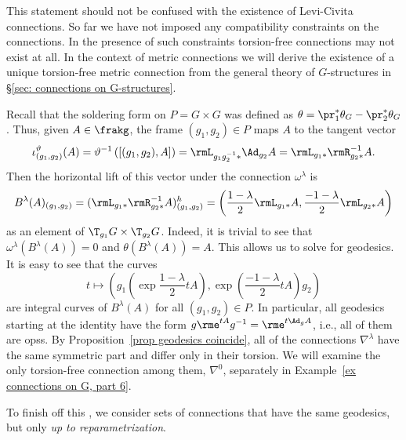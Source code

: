 \begin{rem}
    This statement should not be confused with the existence of Levi-Civita connections. So far we have not imposed any compatibility constraints on the connections. In the presence of such constraints torsion-free connections may not exist at all. In the context of metric connections we will derive the existence of a unique torsion-free metric connection from the general theory of $G$-structures in \S\ref{sec: connections on G-structures}.
\end{rem}



\begin{example}\label{ex connections on G, part 5}
    Recall that the soldering form on $P=G\times G$ was defined as $\theta=\pr_1^\ast\theta_G-\pr_2^\ast\theta_G$. Thus, given $A\in\frakg$, the frame $(g_1,g_2)\in P$ maps $A$ to the tangent vector 
    \[\iota_{(g_1,g_2)}^\vartheta(A)=\vartheta^{-1}\left([(g_1,g_2),A]\right)=\rmL_{g_1g_2^{-1}\ast}\Ad_{g_2}A=\rmL_{g_1\ast}\rmR_{g_2\ast}^{-1}A.\]
    Then the horizontal lift of this vector under the connection $\omega^\lambda$ is 
    \[B^\lambda(A)_{(g_1,g_2)}=(\rmL_{g_1\ast}\rmR_{g_2\ast}^{-1}A)_{(g_1,g_2)}^h=\left(\frac{1-\lambda}{2}\rmL_{g_1\ast}A, \frac{-1-\lambda}{2}\rmL_{g_2\ast}A\right)\]
    as an element of $\T_{g_1}G\times \T_{g_2}G$. Indeed, it is trivial to see that $\omega^\lambda(B^\lambda(A))=0$ and $\theta(B^\lambda(A))=A$. 
    This allows us to solve for geodesics. It is easy to see that the curves 
    \[t\mapsto \left(g_1\left(\exp\frac{1-\lambda}{2}tA\right),\exp\left(\frac{-1-\lambda}{2}tA\right)g_2\right)\] 
    are integral curves of $B^\lambda(A)$ for all $(g_1,g_2)\in P$. In particular, all geodesics starting at the identity have the form $g\rme^{tA}g^{-1}=\rme^{t\Ad_g A}$, i.e., all of them are \glspl{ops}. By Proposition~\ref{prop geodesics coincide}, all of the connections $\nabla^\lambda$ have the same symmetric part and differ only in their torsion. We will examine the only torsion-free connection among them, $\nabla^0$, separately in Example~\ref{ex connections on G, part 6}.
\end{example}



To finish off this \sect, we consider sets of connections that have the same geodesics, but only \emph{up to reparametrization}.


